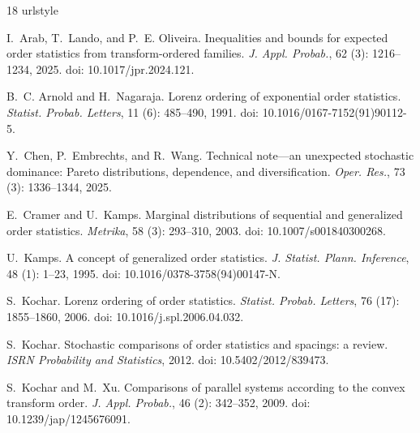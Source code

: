 \documentclass [11pt]{article}
\begin{document}
%
%
\begin{thebibliography}{18}
\providecommand{\natexlab}[1]{#1}
\providecommand{\url}[1]{\texttt{#1}}
\expandafter\ifx\csname urlstyle\endcsname\relax
  \providecommand{\doi}[1]{doi: #1}\else
  \providecommand{\doi}{doi: \begingroup \urlstyle{rm}\Url}\fi

I.~Arab, T.~Lando, and P.~E. Oliveira.
\newblock Inequalities and bounds for expected order statistics from
  transform-ordered families.
\newblock \emph{J. Appl. Probab.}, 62 (3): 1216--1234, 2025.
\newblock \doi{10.1017/jpr.2024.121}.

B.~C. Arnold and H.~Nagaraja.
\newblock Lorenz ordering of exponential order statistics.
\newblock \emph{Statist. Probab. Letters}, 11 (6): 485--490,
  1991.
\newblock \doi{10.1016/0167-7152(91)90112-5}.

Y.~Chen, P.~Embrechts, and R.~Wang.
\newblock Technical note---an unexpected stochastic dominance: {P}areto
  distributions, dependence, and diversification.
\newblock \emph{Oper. Res.}, 73 (3): 1336--1344, 2025.

E.~Cramer and U.~Kamps.
\newblock Marginal distributions of sequential and generalized order
  statistics.
\newblock \emph{Metrika}, 58 (3): 293--310, 2003.
\newblock \doi{10.1007/s001840300268}.

U.~Kamps.
\newblock A concept of generalized order statistics.
\newblock \emph{J. Statist. Plann. Inference}, 48 (1): 1--23,
  1995.
\newblock \doi{10.1016/0378-3758(94)00147-N}.

S.~Kochar.
\newblock Lorenz ordering of order statistics.
\newblock \emph{Statist. Probab. Letters}, 76 (17):
  1855--1860, 2006.
\newblock \doi{10.1016/j.spl.2006.04.032}.

S.~Kochar.
\newblock Stochastic comparisons of order statistics and spacings: a review.
\newblock \emph{ISRN Probability and Statistics}, 2012.
\newblock \doi{10.5402/2012/839473}.

S.~Kochar and M.~Xu.
\newblock Comparisons of parallel systems according to the convex transform
  order.
\newblock \emph{J. Appl. Probab.}, 46 (2): 342--352, 2009.
\newblock \doi{10.1239/jap/1245676091}.


\end{thebibliography}
\end{document}
